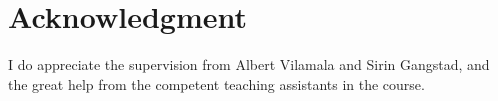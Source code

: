 \section{Acknowledgment}
\label{sec:acknowledgment}
I do appreciate the supervision from Albert Vilamala and Sirin Gangstad, and the great help from the competent teaching assistants in the course.